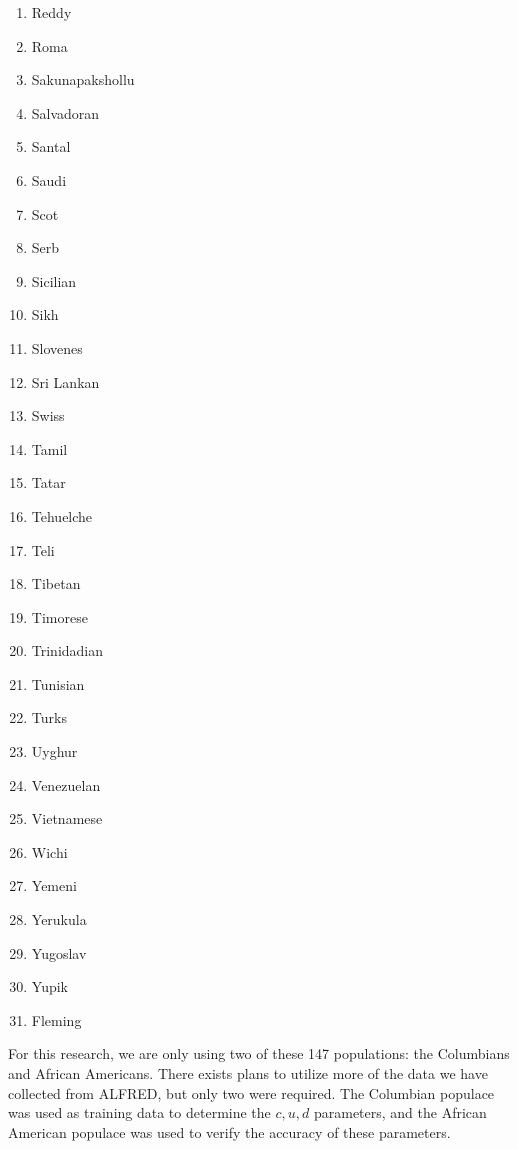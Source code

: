 {\begin{multicols}{4}
\begin{enumerate}
            \item Reddy
            \item Roma
            \item Sakunapakshollu
            \item Salvadoran
            \item Santal
            \item Saudi
            \item Scot
            \item Serb
            \item Sicilian
            \item Sikh
            \item Slovenes
            \item Sri Lankan
            \item Swiss
            \item Tamil
            \item Tatar
            \item Tehuelche
            \item Teli
            \item Tibetan
            \item Timorese
            \item Trinidadian
            \item Tunisian
            \item Turks
            \item Uyghur
            \item Venezuelan
            \item Vietnamese
            \item Wichi
            \item Yemeni
            \item Yerukula
            \item Yugoslav
            \item Yupik
            \item Fleming
        \end{enumerate}
    \end{multicols}
}

For this research, we are only using two of these 147 populations: the Columbians and African Americans.
There exists plans to utilize more of the data we have collected from ALFRED, but only two were required.
The Columbian populace was used as training data to determine the $c, u, d$ parameters, and the African American
populace was used to verify the accuracy of these parameters.

